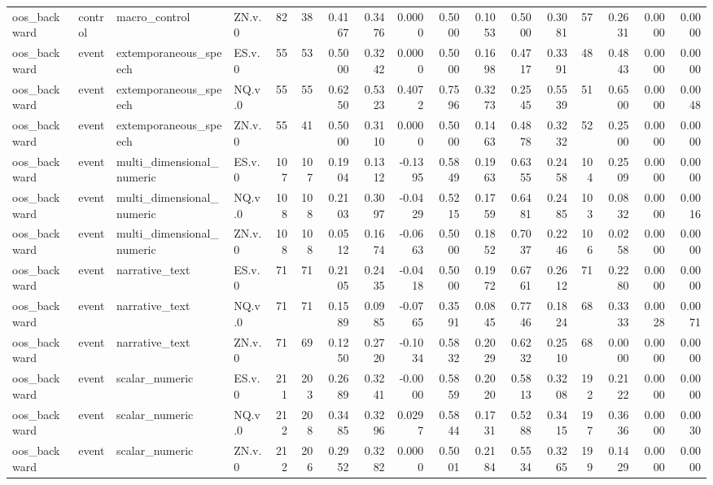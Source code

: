\begin{tabular}{llllrrrrrrrrrrrrr}
oos_backward & control & macro_control & ZN.v.0 & 82 & 38 & 0.4167 & 0.3476 & 0.0000 & 0.5000 & 0.1053 & 0.5000 & 0.3081 & 57 & 0.2631 & 0.0000 & 0.0000 \\
oos_backward & event & extemporaneous_speech & ES.v.0 & 55 & 53 & 0.5000 & 0.3242 & 0.0000 & 0.5000 & 0.1698 & 0.4717 & 0.3391 & 48 & 0.4843 & 0.0000 & 0.0000 \\
oos_backward & event & extemporaneous_speech & NQ.v.0 & 55 & 55 & 0.6250 & 0.5323 & 0.4072 & 0.7596 & 0.3273 & 0.2545 & 0.5539 & 51 & 0.6500 & 0.0000 & 0.0048 \\
oos_backward & event & extemporaneous_speech & ZN.v.0 & 55 & 41 & 0.5000 & 0.3110 & 0.0000 & 0.5000 & 0.1463 & 0.4878 & 0.3232 & 52 & 0.2500 & 0.0000 & 0.0000 \\
oos_backward & event & multi_dimensional_numeric & ES.v.0 & 107 & 107 & 0.1904 & 0.1312 & -0.1395 & 0.5849 & 0.1963 & 0.6355 & 0.2458 & 104 & 0.2509 & 0.0000 & 0.0000 \\
oos_backward & event & multi_dimensional_numeric & NQ.v.0 & 108 & 108 & 0.2103 & 0.3097 & -0.0429 & 0.5215 & 0.1759 & 0.6481 & 0.2485 & 103 & 0.0832 & 0.0000 & 0.0016 \\
oos_backward & event & multi_dimensional_numeric & ZN.v.0 & 108 & 108 & 0.0512 & 0.1674 & -0.0663 & 0.5000 & 0.1852 & 0.7037 & 0.2246 & 106 & 0.0258 & 0.0000 & 0.0000 \\
oos_backward & event & narrative_text & ES.v.0 & 71 & 71 & 0.2105 & 0.2435 & -0.0418 & 0.5000 & 0.1972 & 0.6761 & 0.2612 & 71 & 0.2280 & 0.0000 & 0.0000 \\
oos_backward & event & narrative_text & NQ.v.0 & 71 & 71 & 0.1589 & 0.0985 & -0.0765 & 0.3591 & 0.0845 & 0.7746 & 0.1824 & 68 & 0.3333 & 0.0028 & 0.0071 \\
oos_backward & event & narrative_text & ZN.v.0 & 71 & 69 & 0.1250 & 0.2720 & -0.1034 & 0.5832 & 0.2029 & 0.6232 & 0.2510 & 68 & 0.0000 & 0.0000 & 0.0000 \\
oos_backward & event & scalar_numeric & ES.v.0 & 211 & 203 & 0.2689 & 0.3241 & -0.0000 & 0.5859 & 0.2020 & 0.5813 & 0.3208 & 192 & 0.2122 & 0.0000 & 0.0000 \\
oos_backward & event & scalar_numeric & NQ.v.0 & 212 & 208 & 0.3485 & 0.3296 & 0.0297 & 0.5844 & 0.1731 & 0.5288 & 0.3415 & 197 & 0.3636 & 0.0000 & 0.0030 \\
oos_backward & event & scalar_numeric & ZN.v.0 & 212 & 206 & 0.2952 & 0.3282 & 0.0000 & 0.5001 & 0.2184 & 0.5534 & 0.3265 & 199 & 0.1429 & 0.0000 & 0.0000 \\

\end{tabular}
